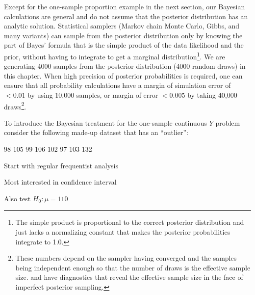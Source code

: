 Except for the one-sample proportion example in the next section, our
Bayesian calculations are general and do not assume that the posterior
distribution has an analytic solution.  Statistical samplers (Markov
chain Monte Carlo, Gibbs, and many variants) can sample from the
posterior distribution only by knowing the part of Bayes' formula that
is the simple product of the data likelihood and the prior, without
having to integrate to get a marginal distribution\footnote{The simple
  product is proportional to the correct posterior distribution and
  just lacks a normalizing constant that makes the posterior
  probabilities integrate to 1.0.}.  We are generating
4000 samples from the posterior distribution (4000 random draws) in
this chapter.  When high precision of posterior probabilities is
required, one can ensure that all probability calculations have a
margin of simulation error of $< 0.01$ by using 10,000 samples, or
margin of error $< 0.005$ by taking 40,000 draws\footnote{These numbers
  depend on the sampler having converged and the samples being independent enough so that the number of draws
  is the effective sample size.   and  have
  diagnostics that reveal the effective sample size in the face of
  imperfect posterior sampling.}.
  
To introduce the Bayesian treatment for the one-sample continuous $Y$
problem consider the following made-up dataset that has an ``outlier'':
\begin{center}
98 105 99 106 102 97 103 132
\end{center}

\bi
\item Start with regular frequentist analysis
\item Most interested in confidence interval
\item Also test $H_{0}: \mu = 110$
\ei

